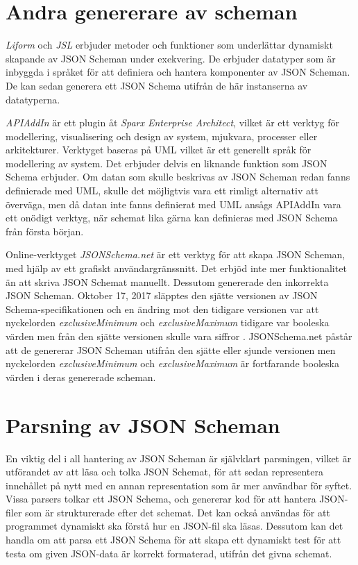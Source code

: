 \section{Andra genererare av scheman}
\textit{Liform} och \textit{JSL} erbjuder metoder och funktioner som underlättar dynamiskt skapande av JSON Scheman under exekvering. De erbjuder datatyper som är inbyggda i språket för att definiera och hantera komponenter av JSON Scheman. De kan sedan generera ett JSON Schema utifrån de här instanserna av datatyperna. \cite{Romanovich,Limenius}

\textit{APIAddIn} är ett plugin åt \textit{Sparx Enterprise Architect}, vilket är ett verktyg för modellering, visualisering och design av system, mjukvara, processer eller arkitekturer. Verktyget baseras på UML vilket är ett generellt språk för modellering av system. Det erbjuder delvis en liknande funktion som JSON Schema erbjuder. Om datan som skulle beskrivas av JSON Scheman redan fanns definierade med UML, skulle det möjligtvis vara ett rimligt alternativ att överväga, men då datan inte fanns definierat med UML ansågs APIAddIn vara ett onödigt verktyg, när schemat lika gärna kan definieras med JSON Schema från första början. \cite{Tomlinson}

Online-verktyget \textit{JSONSchema.net} är ett verktyg för att skapa JSON Scheman, med hjälp av ett grafiskt användargränssnitt. Det erbjöd inte mer funktionalitet än att skriva JSON Schemat manuellt. Dessutom genererade den inkorrekta JSON Scheman. Oktober 17, 2017 släpptes den sjätte versionen av JSON Schema-specifikationen och en ändring mot den tidigare versionen var att nyckelorden \textit{exclusiveMinimum} och \textit{exclusiveMaximum} tidigare var booleska värden men från den sjätte versionen skulle vara siffror \cite{Andrews}. JSONSchema.net påstår att de genererar JSON Scheman utifrån den sjätte eller sjunde versionen men nyckelorden \textit{exclusiveMinimum} och \textit{exclusiveMaximum} är fortfarande booleska värden i deras genererade scheman. \cite{Jackwootton}

\section{Parsning av JSON Scheman}

En viktig del i all hantering av JSON Scheman är självklart parsningen, vilket är utförandet av att läsa och tolka JSON Schemat, för att sedan representera innehållet på nytt med en annan representation som är mer användbar för syftet. Vissa parsers tolkar ett JSON Schema, och genererar kod för att hantera JSON-filer som är strukturerade efter det schemat. Det kan också användas för att programmet dynamiskt ska förstå hur en JSON-fil ska läsas. Dessutom kan det handla om att parsa ett JSON Schema för att skapa ett dynamiskt test för att testa om given JSON-data är korrekt formaterad, utifrån det givna schemat.

